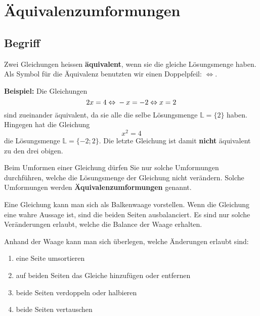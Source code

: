 \newpage
\section{Äquivalenzumformungen}

\subsection{Begriff}
Zwei Gleichungen heissen \textbf{äquivalent}, wenn sie die gleiche Lösungsmenge haben. Als Symbol für die Äquivalenz benutzten wir einen Doppelpfeil: $\Leftrightarrow$.

\begin{example}
  \textbf{Beispiel:} Die Gleichungen
  \[
     2x=4 \\
  \Leftrightarrow	 \\ -x = -2 \\
  \Leftrightarrow \\  x = 2
  \]
  sind zueinander äquivalent, da sie alle die selbe Lösungsmenge $ \mathbb{L} = \{ 2 \}$ haben. Hingegen hat die Gleichung
  \[
  x^{2} = 4
  \]
	die Lösungsmenge $ \mathbb{L} = \{ -2; 2 \}$. Die letzte Gleichung ist damit \textbf{nicht} äquivalent zu den drei obigen.
\end{example}

Beim Umformen einer Gleichung dürfen Sie nur solche Umformungen durchführen, welche die Lösungsmenge der Gleichung nicht verändern.
Solche Umformungen werden \textbf{Äquivalenzumformungen} genannt.

Eine Gleichung kann man sich als Balkenwaage vorstellen. Wenn die Gleichung eine wahre Aussage ist, sind die beiden Seiten ausbalanciert. Es sind nur solche Veränderungen erlaubt, welche die Balance der Waage erhalten.
\begin{center}
\end{center}

Anhand der Waage kann man sich überlegen, welche Änderungen erlaubt sind:

\begin{enumerate}
  \item eine Seite umsortieren
  \item auf beiden Seiten das Gleiche hinzufügen oder entfernen
  \item beide Seiten verdoppeln oder halbieren
  \item beide Seiten vertauschen
\end{enumerate}

